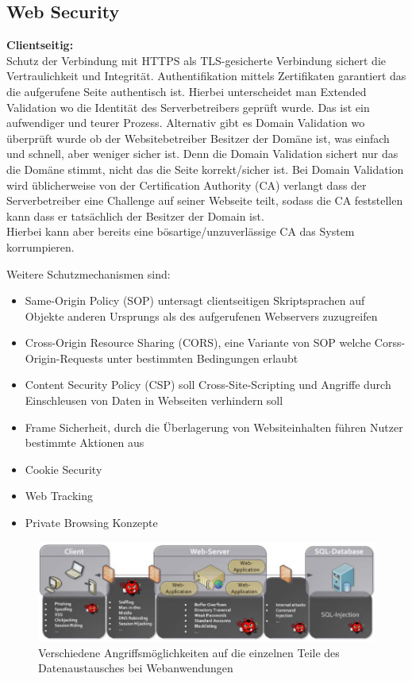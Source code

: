 \documentclass[a4paper,12pt,leqno]{article}
\begin{document}
\subsection{Web Security}


\textbf{Clientseitig:}\\
Schutz der Verbindung mit HTTPS als TLS-gesicherte Verbindung sichert die Vertraulichkeit und Integrität. Authentifikation mittels Zertifikaten garantiert das die aufgerufene Seite authentisch ist. Hierbei unterscheidet man Extended Validation wo die Identität des Serverbetreibers  geprüft wurde. Das ist ein aufwendiger und teurer Prozess. Alternativ gibt es Domain Validation wo überprüft wurde ob der Websitebetreiber Besitzer der Domäne ist, was einfach und schnell, aber weniger sicher ist. Denn die Domain Validation sichert nur das die Domäne stimmt, nicht das die Seite korrekt/sicher ist. Bei Domain Validation wird üblicherweise von der Certification Authority (CA) verlangt dass der Serverbetreiber eine Challenge auf seiner Webseite teilt, sodass die CA feststellen kann dass er tatsächlich der Besitzer der Domain ist.\\
Hierbei kann aber bereits eine bösartige/unzuverlässige CA das System korrumpieren.

Weitere Schutzmechanismen sind:
\begin{itemize}
\item Same-Origin Policy (SOP) untersagt clientseitigen Skriptsprachen auf Objekte anderen Ursprungs als des aufgerufenen Webservers zuzugreifen
\item Cross-Origin Resource Sharing (CORS), eine Variante von SOP welche Corss-Origin-Requests unter bestimmten Bedingungen erlaubt
\item Content Security Policy (CSP) soll Cross-Site-Scripting und Angriffe durch Einschleusen von Daten in Webseiten verhindern soll
\item Frame Sicherheit, durch die Überlagerung von Websiteinhalten führen Nutzer bestimmte Aktionen aus
\item Cookie Security
\item Web Tracking
\item Private Browsing Konzepte
\end{itemize}

\begin{figure}[h!]
\centering
\includegraphics[scale=0.65]{Grafiken/AngriffeWebanwendung.png}
\caption{Verschiedene Angriffsmöglichkeiten auf die einzelnen Teile des Datenaustausches bei Webanwendungen}
\end{figure}
\end{document}
